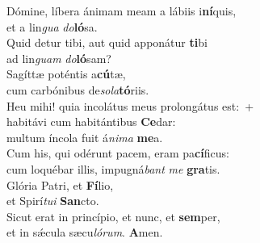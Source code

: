 \evenverse Dómine, líbera ánimam meam a lábiis i\textbf{ní}quis,~\*\\
\evenverse et a lin\textit{gua} \textit{do}\textbf{ló}sa.\\
\oddverse Quid detur tibi, aut quid apponátur \textbf{ti}bi~\*\\
\oddverse ad lin\textit{guam} \textit{do}\textbf{ló}sam?\\
\evenverse Sagíttæ poténtis a\textbf{cú}tæ,~\*\\
\evenverse cum carbónibus de\textit{so}\textit{la}\textbf{tó}riis.\\
\oddverse Heu mihi! quia incolátus meus prolongátus est:~+\\
\oddverse  habitávi cum habitántibus \textbf{Ce}dar:~\*\\
\oddverse multum íncola fuit á\textit{ni}\textit{ma} \textbf{me}a.\\
\evenverse Cum his, qui odérunt pacem, eram pa\textbf{cí}ficus:~\*\\
\evenverse cum loquébar illis, impugná\textit{bant} \textit{me} \textbf{gra}tis.\\
\oddverse Glória Patri, et \textbf{Fí}lio,~\*\\
\oddverse et Spirí\textit{tu}\textit{i} \textbf{San}cto.\\
\evenverse Sicut erat in princípio, et nunc, et \textbf{sem}per,~\*\\
\evenverse et in sǽcula sæcu\textit{ló}\textit{rum}. \textbf{A}men.\\
